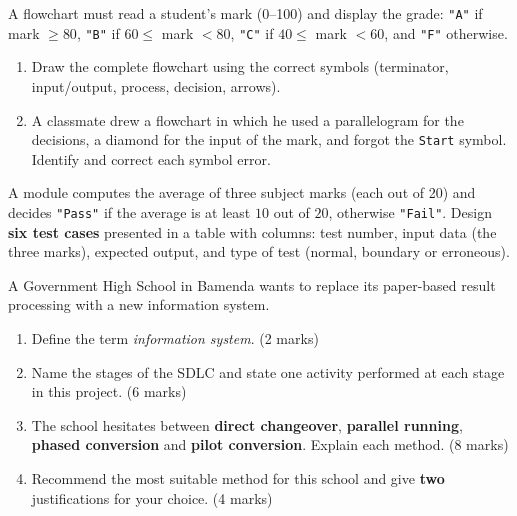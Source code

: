 \documentclass[11pt]{article}
\newcounter{popsec}
\newcounter{popsub}
\newcommand{\courssub}[1]{%
  \stepcounter{popsub}%
  \par\vspace{9pt}\noindent{\popxbold\fontsize{11.5}{13}\selectfont\color{popink}{\color{poporange}\thepopsec.\thepopsub}\hspace{6pt}#1}\par\nopagebreak\vspace{4pt}
}
\begin{document}
\begin{exercice}
A flowchart must read a student's mark (0--100) and display the grade: \texttt{"A"} if mark $\geq 80$, \texttt{"B"} if $60 \leq$ mark $< 80$, \texttt{"C"} if $40 \leq$ mark $< 60$, and \texttt{"F"} otherwise.
\begin{enumerate}
\item Draw the complete flowchart using the correct symbols (terminator, input/output, process, decision, arrows).
\item A classmate drew a flowchart in which he used a parallelogram for the decisions, a diamond for the input of the mark, and forgot the \texttt{Start} symbol. Identify and correct each symbol error.
\end{enumerate}
\end{exercice}

\begin{exercice}
A module computes the average of three subject marks (each out of 20) and decides \texttt{"Pass"} if the average is at least $10$ out of $20$, otherwise \texttt{"Fail"}. Design \textbf{six test cases} presented in a table with columns: test number, input data (the three marks), expected output, and type of test (normal, boundary or erroneous).
\end{exercice}

\courssub{I prepare for the GCE}

\begin{exercice}
A Government High School in Bamenda wants to replace its paper-based result processing with a new information system.
\begin{enumerate}
\item Define the term \emph{information system}. \hfill (2 marks)
\item Name the stages of the SDLC and state one activity performed at each stage in this project. \hfill (6 marks)
\item The school hesitates between \textbf{direct changeover}, \textbf{parallel running}, \textbf{phased conversion} and \textbf{pilot conversion}. Explain each method. \hfill (8 marks)
\item Recommend the most suitable method for this school and give \textbf{two} justifications for your choice. \hfill (4 marks)
\end{enumerate}
\end{exercice}
\end{document}
